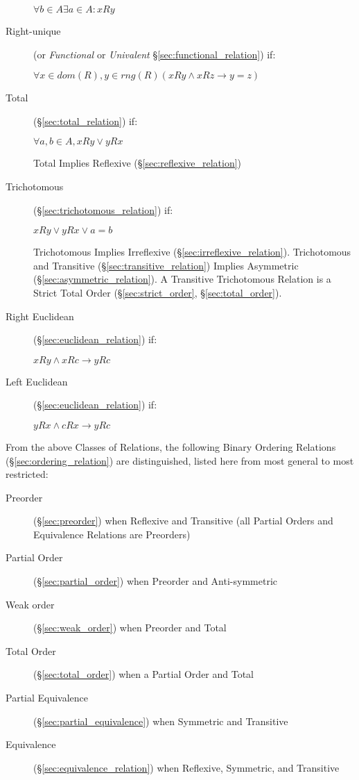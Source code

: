\begin{description}
  $ \forall b \in A \exists a \in A : xRy $

\item[Right-unique] (or \emph{Functional} or \emph{Univalent}
  \S\ref{sec:functional_relation}) if:

  $ \forall x \in dom(R), y \in rng(R)
    (xRy \wedge xRz \rightarrow y = z) $

\item[Total] (\S\ref{sec:total_relation}) if:

  $ \forall a,b \in A, xRy \vee yRx $

  Total Implies Reflexive (\S\ref{sec:reflexive_relation})

\item[Trichotomous] (\S\ref{sec:trichotomous_relation}) if:

  $ xRy \vee yRx \vee a = b $

  Trichotomous Implies Irreflexive (\S\ref{sec:irreflexive_relation}).
  Trichotomous and Transitive (\S\ref{sec:transitive_relation})
  Implies Asymmetric (\S\ref{sec:asymmetric_relation}). A Transitive
  Trichotomous Relation is a Strict Total Order
  (\S\ref{sec:strict_order}, \S\ref{sec:total_order}).

\item[Right Euclidean] (\S\ref{sec:euclidean_relation}) if:

  $ xRy \wedge xRc \rightarrow yRc $

\item[Left Euclidean] (\S\ref{sec:euclidean_relation}) if:

  $ yRx \wedge cRx \rightarrow yRc $

\end{description}

From the above Classes of Relations, the following Binary Ordering
Relations (\S\ref{sec:ordering_relation}) are distinguished, listed
here from most general to most restricted:

\begin{description}
\item[Preorder] (\S\ref{sec:preorder}) when Reflexive and Transitive
  (all Partial Orders and Equivalence Relations are Preorders)
\item[Partial Order] (\S\ref{sec:partial_order}) when Preorder and
  Anti-symmetric
\item[Weak order] (\S\ref{sec:weak_order}) when Preorder and Total
\item[Total Order] (\S\ref{sec:total_order}) when a Partial Order and
  Total
\item[Partial Equivalence] (\S\ref{sec:partial_equivalence}) when
  Symmetric and Transitive
\item[Equivalence] (\S\ref{sec:equivalence_relation}) when Reflexive,
  Symmetric, and Transitive
\end{description}

